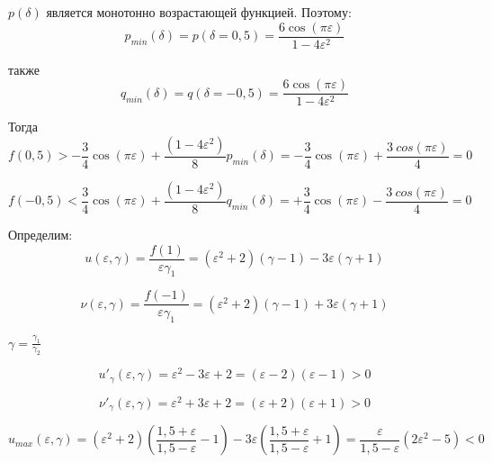 $p(\delta)$ является монотонно возрастающей функцией. Поэтому:
\begin{equation}
	\label{eq:equation44}
	p_{min}(\delta) = p(\delta = 0,5) = \frac{6 \cos(\pi  \varepsilon)}{1-4\varepsilon ^2}
\end{equation}

также
\begin{equation}
	\label{eq:equation45}
	q_{min}(\delta) = q(\delta = -0,5) = \frac{6 \cos(\pi  \varepsilon)}{1-4\varepsilon ^2}
\end{equation}

Тогда
\begin{equation}
	\label{eq:equation46}
	f(0,5) > -\frac{3}{4} \cos (\pi \varepsilon) + \frac{(1-4 \varepsilon ^2)}{8} p_{min} (\delta) = - \frac{3}{4} \cos(\pi \varepsilon) + \frac{3 \ cos(\pi \varepsilon)}{4} = 0 
\end{equation}

\begin{equation}
	\label{eq:equation47}
	f(-0,5) < \frac{3}{4} \cos (\pi \varepsilon) + \frac{(1-4 \varepsilon ^2)}{8} q_{min} (\delta) = + \frac{3}{4} \cos(\pi \varepsilon) - \frac{3 \ cos(\pi \varepsilon)}{4} = 0 
\end{equation}

Определим:
\begin{equation}
	\label{eq:equation48}
	u(\varepsilon, \gamma) = \frac{f(1)}{\varepsilon \gamma_1} = (\varepsilon ^2 + 2) (\gamma - 1) - 3\varepsilon (\gamma + 1)
\end{equation}

\begin{equation}
	\label{eq:equation49}
	\nu(\varepsilon, \gamma) = \frac{f(-1)}{\varepsilon \gamma_1} = (\varepsilon ^2 + 2) (\gamma - 1) + 3\varepsilon (\gamma + 1)
\end{equation}

$\gamma = \frac{\gamma_1}{\gamma_2}$

\begin{equation}
	\label{eq:equation50}
	u'_{\gamma}(\varepsilon, \gamma) = \varepsilon^2 - 3\varepsilon + 2 = (\varepsilon - 2)(\varepsilon -1) >0
\end{equation}

\begin{equation}
	\label{eq:equation51}
	{\nu}'_\gamma
	(\varepsilon, \gamma) = \varepsilon^2 + 3\varepsilon + 2 = (\varepsilon + 2)(\varepsilon + 1) >0
\end{equation}


\begin{equation}
	\label{eq:equation52}
	u _{max}(\varepsilon, \gamma) =
	\left( {\varepsilon^2+2} \right) 
	\left( {\frac{1,5+\varepsilon}{1,5-\varepsilon}-1} \right) - 3 \varepsilon 
	\left( {\frac{1,5+\varepsilon}{1,5-\varepsilon}+1} \right) = \frac{\varepsilon}{1,5-\varepsilon}(2\varepsilon^2 - 5) < 0
\end{equation}

